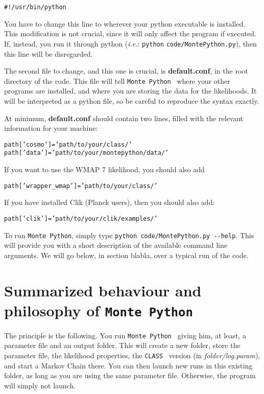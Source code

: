 \documentclass[10pt]{article}
\newcommand{\CLASS}{\texttt{CLASS}}
\newcommand{\MP}{\texttt{Monte Python}}
\begin{document}
 \begin{alltt}
    #!/usr/bin/python
 \end{alltt}

 You have to change this line to wherever your python executable is installed.
 This modification is not crucial, since it will only affect the program if
 executed. If, instead, you run it through python (\emph{i.e.}: \verb?python?
 \verb?code/MontePython.py?), then this line will be disregarded.

 The second file to change, and this one is crucial, is {\bf default.conf}, in
 the root directory of the code. This file will tell \MP~ where your
 other programs are installed, and where you are storing the data for the
 likelihoods. It will be interpreted as a python file, so be careful to
 reproduce the syntax exactly.

 At minimum, {\bf default.conf} should contain two lines, filled with the
 relevant information for your machine:
 \begin{alltt}
   path['cosmo']   = 'path/to/your/class/'
   path['data']    = 'path/to/your/montepython/data/'
 \end{alltt}
 
 If you want to use the WMAP 7 likelihood, you should also add
 \begin{alltt}
   path['wrapper_wmap']   = 'path/to/your/class/'
 \end{alltt}

 If you have installed Clik (Planck users), then you should also add:
 \begin{alltt}
   path['clik']    = 'path/to/your/clik/examples/'
 \end{alltt}
 
 To run \MP, simply type \verb?python code/MontePython.py --help?. This will provide you with a short description of the available command line arguments. We will go below, in section blabla, over a typical run of the code.
 
\newpage
\section{Summarized behaviour and philosophy of \MP}

  The principle is the following. You run \MP~ giving him, at least, a
  parameter file and an output folder. This will create a new folder, store the
  parameter file, the likelihood properties, the \CLASS~ version (in
  \emph{folder/log.param}), and start a Markov Chain there.  You can then
  launch new runs in this existing folder, as long as you are using the same
  parameter file. Otherwise, the program will simply not launch.\\
\end{document}
